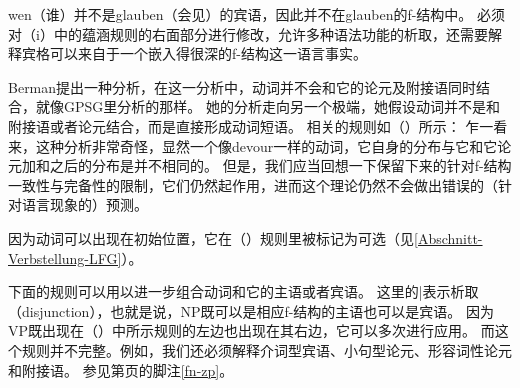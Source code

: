 {\noindent
wen（谁）并不是glauben（会见）的宾语，因此并不在glauben的f-结构中。
必须对（i）中的蕴涵规则的右面部分进行修改，允许多种语法功能的析取，还需要解释宾格可以来自于一个嵌入得很深的f-结构这一语言事实。
\ea
\label{le-verschlingen}
\z

\noindent
Berman提出一种分析，在这一分析中，动词并不会和它的论元及附接语同时结合，就像GPSG\indexgpsgc 里分析的那样。
她的分析走向另一个极端，她假设动词并不是和附接语或者论元结合，而是直接形成动词短语。
相关的规则如（）所示：
\ea
\label{LFG-v-vp}
\z
乍一看来，这种分析非常奇怪，显然一个像devour一样的动词，它自身的分布与它和它论元加和之后的分布是并不相同的。
但是，我们应当回想一下保留下来的针对f-结构一致性与完备性的限制，它们仍然起作用，进而这个理论仍然不会做出错误的（针对语言现象的）预测。
}%

因为动词可以出现在初始位置，它在（）规则里被标记为可选（见\ref{Abschnitt-Verbstellung-LFG}）。

下面的规则可以用以进一步组合动词和它的主语或者宾语。
\ea
\label{lfg-vp-regel}
\z
这里的|\isc{$\vert$}\is{$\vert$}表示析取（disjunction），也就是说，NP既可以是相应f-结构的主语也可以是宾语。
因为VP既出现在（）中所示规则的左边也出现在其右边，它可以多次进行应用。
而这个规则并不完整。例如，我们还必须解释介词型宾语、小句型论元、形容词性论元和附接语。
参见第\pageref{fn-zp}页的脚注\ref{fn-zp}。

